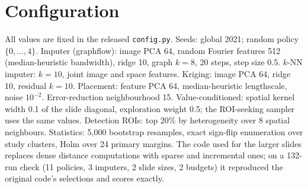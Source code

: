 \documentclass{article}
\begin{document}
\section{Configuration}
\label{app:repro}

All values are fixed in the released \texttt{config.py}. Seeds: global 2021; random policy $\{0,\dots,4\}$.
Imputer (graphflow): image PCA 64, random Fourier features 512 (median-heuristic bandwidth), ridge 10, graph
$k=8$, 20 steps, step size 0.5. $k$-NN imputer: $k=10$, joint image and space features. Kriging: image PCA 64,
ridge 10, residual $k=10$. Placement: feature PCA 64, median-heuristic lengthscale, noise $10^{-2}$.
Error-reduction neighbourhood 15. Value-conditioned: spatial kernel width 0.1 of the slide diagonal,
exploration weight 0.5; the ROI-seeking sampler uses the same values. Detection ROIs: top 20\% by heterogeneity
over 8 spatial neighbours. Statistics: 5{,}000 bootstrap resamples, exact sign-flip enumeration over study
clusters, Holm over 24 primary margins. The code used for the larger slides replaces dense distance computations
with sparse and incremental ones; on a 132-run check (11 policies, 3 imputers, 2 slide sizes, 2 budgets) it
reproduced the original code's selections and scores exactly.

\clearpage


\end{document}
